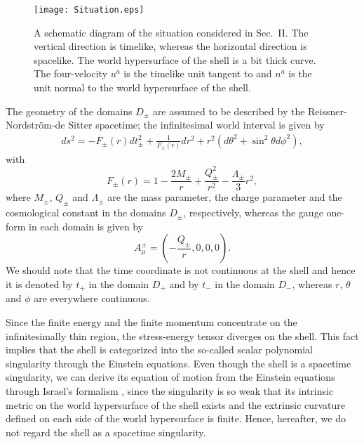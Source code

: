 \documentclass[aps,preprint,preprintnumber,nofootinbib,amsmath,amssymb,ascmac,bm,12pt]{revtex4}
\begin{document}
\begin{figure}[!h]
\centering\texttt{[image: Situation.eps]}
\caption{ A schematic diagram of the situation considered in Sec.~II. The vertical direction is 
timelike, whereas the horizontal direction is spacelike. The world hypersurface 
of the shell is a bit thick curve. The four-velocity $u^a$ is the timelike unit tangent to and 
$n^a$ is the unit normal to the world hypersurface of the shell. }
\label{situation}
\end{figure}


The geometry of the domains $D_{\pm}$ are assumed to be 
described by the Reissner-Nordstr\"{o}m-de Sitter spacetime; the infinitesimal world interval is given by 
\begin{eqnarray}
ds^2=-F_\pm (r)dt_\pm^2+\frac{1}{F_\pm(r)}dr^2
+r^2\left(d\theta^2+\sin^2\theta d\phi^2\right), \label{RN}
\end{eqnarray}
with
\begin{equation}
F_\pm(r)=1-\frac{2M_\pm}{r}+\frac{Q_\pm^2}{r^2}-\frac{\Lambda_\pm}{3}r^2,
\end{equation}
where $M_\pm$, $Q_\pm$ and $\Lambda_\pm$ are the mass parameter,  
the charge parameter and the cosmological constant in the domains $D_\pm$, respectively, 
whereas the gauge one-form in each domain is given by
\begin{equation}
A^\pm_\mu=\left(-\frac{Q_\pm}{r},0,0,0\right). 
\end{equation}
We should note that the time coordinate is 
not continuous at the shell and hence it is denoted by $t_+$ 
in the domain $D_+$ and by $t_-$ in the domain $D_-$, 
whereas $r$, $\theta$ and $\phi$ are everywhere continuous. 


Since the finite energy and the finite momentum concentrate on the  
infinitesimally thin region, the stress-energy tensor diverges on the shell. This fact implies  
that the shell is categorized into the so-called scalar polynomial singularity \cite{Hawking-Ellis} 
through the Einstein equations. 
Even though the shell is a spacetime singularity, we can derive its equation of 
motion from the Einstein equations 
through Israel's formalism \cite{Israel1966}, since the singularity is so weak that its 
intrinsic metric on the world hypersurface of the shell exists 
and the extrinsic curvature defined on each side of the world hypersurface is finite.  
Hence, hereafter, we do not regard the shell as  
a spacetime singularity. 
\end{document}
